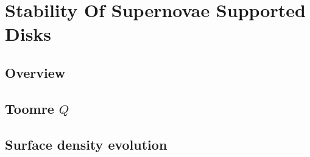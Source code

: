 \chapter{Stability Of Supernovae Supported Disks}\label{sec:analysis}

\section{Overview}


\section{Toomre $Q$}\label{sec:toomqsims}


\clearpage
\section{Surface density evolution}\label{sec:anal_sdevo}

